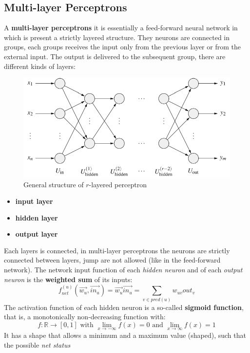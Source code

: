 \documentclass{article}
\begin{document}
\subsection{Multi-layer Perceptrons}
A \textbf{multi-layer perceptrons} it is essentially a feed-forward neural network
in which is present a strictly layered structure. They neurons are connected in groups,
each groups receives the input only from the previous layer or from the external input.
The output is delivered to the subsequent group, there are different kinds of layers:
\begin{figure}[H]
    \centering
    \includegraphics[scale=0.5]{images/multi-layer-percep.png}
    \caption{General structure of $r$-layered perceptron}
\end{figure}
\begin{itemize}
    \item \textbf{input layer}
    \item \textbf{hidden layer}
    \item \textbf{output layer}
\end{itemize}
Each layers is connected, in multi-layer perceptrons the neurons are strictly connected
between layers, jump are not allowed (like in the feed-forward network).
\newline\newline
The network input function of each \textit{hidden neuron} and of each \textit{output neuron}
is the \textbf{weighted sum} of its inputs:
$$f_{net}^{(u)}(\vec{w_u},\vec{in_u})=\vec{w_u}\vec{in_u}=\sum_{v\in pred(u)}w_{uv}out_v$$
The activation function of each hidden neuron is a so-called \textbf{sigmoid function},
that is, a monotonically non-decreasing function with:
$$f:\mathbb{R}\rightarrow [0,1]\text{ with }\lim_{x\rightarrow -\infty}f(x)=0\text{ and }\lim_{x\rightarrow\infty}f(x)=1$$
It has a shape that allows a minimum and a maximum value (shaped), such that the possible \textit{net status}
\end{document}
